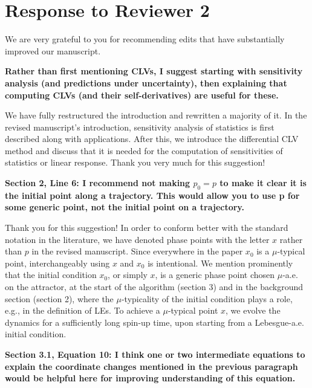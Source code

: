 \documentclass[11pt]{article}
\newcommand{\highlight}[1]{{\color{burgundy}\textbf{#1}}}
\begin{document}
\section*{Response to Reviewer 2}
We are very grateful to you for recommending edits that have substantially improved our manuscript.

\highlight{Rather than first mentioning CLVs, I suggest starting with sensitivity analysis (and predictions under
uncertainty), then explaining that computing CLVs (and their self-derivatives) are useful for these.}

We have fully restructured the introduction and rewritten a majority of it. In the revised manuscript's introduction, sensitivity analysis of statistics is first described along with applications. After this, we introduce the differential CLV method and discuss that it is needed for the computation of sensitivities of statistics or linear response. Thank you very much for this suggestion!

\highlight{Section 2, Line 6: I recommend not making $p_0 = p$ to make it clear it is the initial point along a trajectory. This
would allow you to use p for some generic point, not the initial point on a trajectory.}

Thank you for this suggestion!
In order to conform better with the standard notation in the literature, we have denoted phase points with the letter $x$ rather than $p$ in the revised manuscript. Since everywhere in the paper $x_0$ is a $\mu$-typical point, interchangeably using $x$ and $x_0$ is intentional. We mention prominently that the initial condition $x_0$, or simply $x$, is a generic phase point chosen $\mu$-a.e. on the attractor, at the start of the algorithm (section 3) and in the background section (section 2), where the $\mu$-typicality of the initial condition plays a role, e.g., in the definition of LEs. To achieve a $\mu$-typical point $x$, we evolve the dynamics for a sufficiently long spin-up time, upon starting from a Lebesgue-a.e. initial condition.  

\highlight{Section 3.1, Equation 10: I think one or two intermediate equations to explain the coordinate changes mentioned
in the previous paragraph would be helpful here for improving understanding of this equation.}
\end{document}
